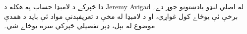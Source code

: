 \documentclass[../../../include/open-logic-chapter]{subfiles}
\begin{document}

\begin{editorial}
دا څپرکے د لامبډا حساب په هکله د Jeremy Avigad له اصلي لنډو
يادښتونو جوړ دے۔ برخې ئې يوځاے کول غواړي، او د لامبډا له مخې د
تعريفېدنې مواد ئې بايد د همدې موضوع له بېل، ډېر تفصيلي څپرکي سره
يوځاے شي۔
\end{editorial}














\OLEndChapterHook
\end{document}
